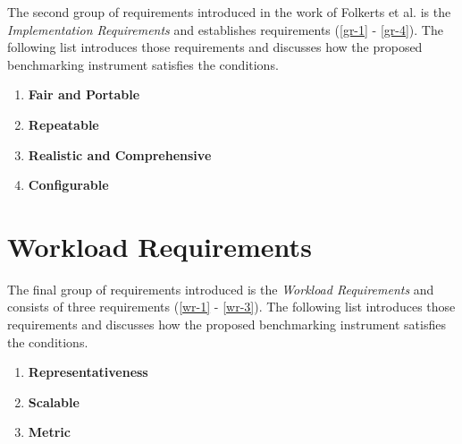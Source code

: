 The second group of requirements introduced in the work of Folkerts et al. is the \textit{Implementation Requirements} and establishes requirements (\ref{gr-1} - \ref{gr-4}). The following list introduces those requirements and discusses how the proposed benchmarking instrument satisfies the conditions.


\begin{enumerate}[label=\textbf{IR\arabic*}, leftmargin=3\parindent]
    \item \textbf{Fair and Portable}
    \label{ir-1}

    
    \item \textbf{Repeatable}
    \label{ir-2}
    
    \item \textbf{Realistic and Comprehensive}
    \label{ir-3}

    \item \textbf{Configurable}
    \label{ir-4}
\end{enumerate}


\section{Workload Requirements}
\label{sec:system:analysis:workload}
The final group of requirements introduced is the \textit{Workload Requirements} and consists of three requirements (\ref{wr-1} - \ref{wr-3}). The following list introduces those requirements and discusses how the proposed benchmarking instrument satisfies the conditions.

\begin{enumerate}[label=\textbf{WR\arabic*}, leftmargin=3\parindent]
    \item \textbf{Representativeness}
    \label{wr-1}
    
    \item \textbf{Scalable}
    \label{wr-2}
    
    \item \textbf{Metric}
    \label{wr-3}

\end{enumerate}